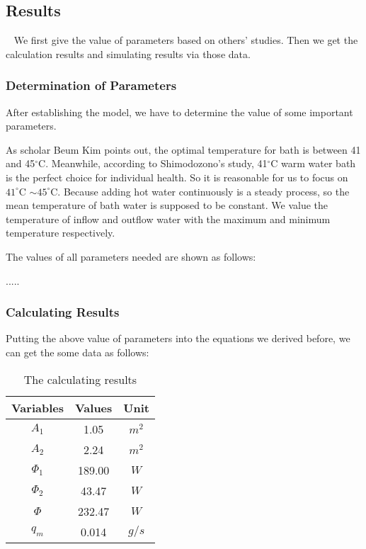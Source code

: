 \documentclass{mcmthesis}
\begin{document}
\subsection{Results}

\quad~ We first give the value of parameters based on others’ studies. Then we 
get the calculation results and simulating results via those data.

\subsubsection{Determination of Parameters}

After establishing the model, we have to determine the value of some
important parameters.

As scholar Beum Kim points out, the optimal temperature for bath is
between 41 and 45$^\circ$C. Meanwhile, according to Shimodozono's study, 
41$^\circ$C warm water bath is the perfect choice for individual health. 
So it is reasonable for us to focus on $41^\circ$C $\sim 45^\circ$C. Because 
adding hot water continuously is a steady process, so the mean temperature 
of bath water is supposed to be constant. We value the temperature of inflow 
and outflow water with the maximum and minimum temperature respectively.

The values of all parameters needed are shown as follows:

.....

\subsubsection{Calculating Results}

Putting the above value of parameters into the equations we derived before, we 
can get the some data as follows:

\begin{table}[h]  %
\centering        %
\caption{The calculating results}  %
\vspace{0.15cm}
\label{tab2}                       %
\begin{tabular}{|c|c|c|}  %
\hline                    %
Variables & Values & Unit     \\ \hline  %
$A_1$     & 1.05   &   $m^2$  \\ \hline
$A_2$     & 2.24   &   $m^2$  \\ \hline
$\Phi_1$  & 189.00 &   $W$   \\ \hline
$\Phi_2$  & 43.47  &   $W$   \\ \hline
$\Phi$    & 232.47 &   $W$   \\ \hline
$q_m$     & 0.014  &   $g/s$ \\ \hline
\end{tabular}
\end{table}
\end{document}
